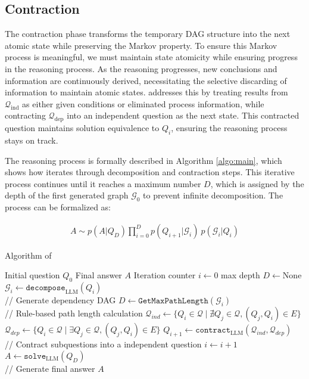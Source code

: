 \subsection{Contraction}
The contraction phase transforms the temporary DAG structure into the next atomic state while preserving the Markov property. To ensure this Markov process is meaningful, we must maintain state atomicity while ensuring progress in the reasoning process. As the reasoning progresses, new conclusions and information are continuously derived, necessitating the selective discarding of information to maintain atomic states. \our addresses this by treating results from $\mathcal{Q}_{\text{ind}}$ as either given conditions or eliminated process information, while contracting $\mathcal{Q}_{\text{dep}}$ into an independent question as the next state. This contracted question maintains solution equivalence to $Q_i$, ensuring the reasoning process stays on track.

The reasoning process is formally described in Algorithm \ref{algo:main}, which shows how \our iterates through decomposition and contraction steps. This iterative process continues until it reaches a maximum number $D$, which is assigned by the depth of the first generated graph $\mathcal{G}_0$ to prevent infinite decomposition. The process can be formalized as:

\begin{align}  
A \sim p(A|Q_D) \prod_{i=0}^D p(Q_{i+1}|\mathcal{G}_i)\  p(\mathcal{G}_i|Q_i)  
\end{align}


\begin{algorithm}[t]
\caption{Algorithm of \our}
\begin{algorithmic}[1]
\label{algo:main}
\small
\REQUIRE Initial question $Q_0$
\ENSURE Final answer $A$
\STATE Iteration counter $i \gets 0$
\STATE max depth $D \gets \text{None}$
    \STATE $\mathcal{G}_i \gets \texttt{decompose}_{\text{LLM}}(Q_i)$ \\ // Generate dependency DAG
        \STATE $D \gets \texttt{GetMaxPathLength}(\mathcal{G}_i)$ \\ // Rule-based path length calculation
    \ENDIF
    \STATE $\mathcal{Q}_{ind} \gets \{Q_i \in \mathcal{Q} \mid \nexists Q_j \in \mathcal{Q}, (Q_j, Q_i) \in E\}$
    \STATE $\mathcal{Q}_{dep} \gets \{Q_i \in \mathcal{Q} \mid \exists Q_j \in \mathcal{Q}, (Q_j, Q_i) \in E\}$
    \STATE $Q_{i+1} \gets \texttt{contract}_{\text{LLM}}(\mathcal{Q}_{ind}, \mathcal{Q}_{dep})$ \\ // Contract subquestions into a independent question
    \STATE $i \gets i + 1$
\ENDWHILE
\STATE $A \gets \texttt{solve}_{\text{LLM}}(Q_D)$ \\ // Generate final answer
\RETURN $A$
\end{algorithmic}
\end{algorithm}
